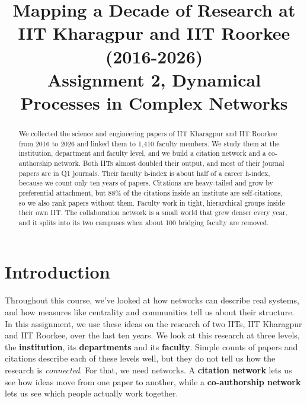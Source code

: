 \documentclass[conference,10pt]{IEEEtran}
\begin{document}
\title{Mapping a Decade of Research at\\IIT Kharagpur and IIT Roorkee (2016-2026)\\[4pt]
\large Assignment 2, Dynamical Processes in Complex Networks}

\author{
}

\maketitle

\begin{abstract}
We collected the science and engineering papers of IIT Kharagpur and IIT Roorkee from 2016 to 2026 and linked them to
1,410 faculty members. We study them at the institution, department and faculty level, and we build a citation network
and a co-authorship network. Both IITs almost doubled their output, and most of their journal papers are in Q1 journals.
Their faculty h-index is about half of a career h-index, because we count only ten years of papers. Citations are
heavy-tailed and grow by preferential attachment, but 88\% of the citations inside an institute are self-citations, so
we also rank papers without them. Faculty work in tight, hierarchical groups inside their own IIT. The collaboration
network is a small world that grew denser every year, and it splits into its two campuses when about 100 bridging
faculty are removed.
\end{abstract}

\section{Introduction}
Throughout this course, we've looked at how networks can describe real systems, and how measures like centrality and
communities tell us about their structure. In this assignment, we use these ideas on the research of two IITs, IIT
Kharagpur and IIT Roorkee, over the last ten years. We look at this research at three levels, the
\textbf{institution}, its \textbf{departments} and its \textbf{faculty}. Simple counts of papers and citations describe
each of these levels well, but they do not tell us how the research is \textit{connected}. For that, we need networks.
A \textbf{citation network} lets us see how ideas move from one paper to another, while a \textbf{co-authorship
network} lets us see which people actually work together.
\end{document}
